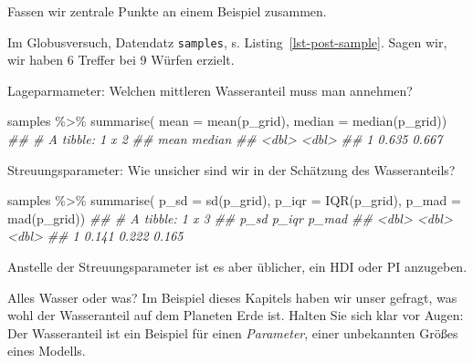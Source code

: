 \documentclass[
  a4paper,
  DIV=11]{scrreprt}
\newenvironment{Shaded}{\begin{snugshade}}{\end{snugshade}}
\newcommand{\AttributeTok}[1]{\textcolor[rgb]{0.40,0.45,0.13}{#1}}
\newcommand{\DocumentationTok}[1]{\textcolor[rgb]{0.37,0.37,0.37}{\textit{#1}}}
\newcommand{\FunctionTok}[1]{\textcolor[rgb]{0.28,0.35,0.67}{#1}}
\newcommand{\NormalTok}[1]{\textcolor[rgb]{0.00,0.23,0.31}{#1}}
\newcommand{\SpecialCharTok}[1]{\textcolor[rgb]{0.37,0.37,0.37}{#1}}
\theoremstyle{definition}
\theoremstyle{remark}
\begin{document}
Fassen wir zentrale Punkte an einem Beispiel zusammen.

Im Globusversuch, Datendatz \texttt{samples}, s.
Listing~\ref{lst-post-sample}. Sagen wir, wir haben 6 Treffer bei 9
Würfen erzielt.

Lageparmameter: Welchen mittleren Wasseranteil muss man annehmen?

\begin{Shaded}
\begin{Highlighting}[]
\NormalTok{samples }\SpecialCharTok{\%\textgreater{}\%} 
  \FunctionTok{summarise}\NormalTok{(}
    \AttributeTok{mean   =} \FunctionTok{mean}\NormalTok{(p\_grid),}
    \AttributeTok{median =} \FunctionTok{median}\NormalTok{(p\_grid))  }
\DocumentationTok{\#\# \# A tibble: 1 x 2}
\DocumentationTok{\#\#    mean median}
\DocumentationTok{\#\#   \textless{}dbl\textgreater{}  \textless{}dbl\textgreater{}}
\DocumentationTok{\#\# 1 0.635  0.667}
\end{Highlighting}
\end{Shaded}

Streuungsparameter: Wie unsicher sind wir in der Schätzung des
Wasseranteils?

\begin{Shaded}
\begin{Highlighting}[]
\NormalTok{samples }\SpecialCharTok{\%\textgreater{}\%} 
  \FunctionTok{summarise}\NormalTok{(}
    \AttributeTok{p\_sd   =} \FunctionTok{sd}\NormalTok{(p\_grid),}
    \AttributeTok{p\_iqr =} \FunctionTok{IQR}\NormalTok{(p\_grid),}
    \AttributeTok{p\_mad =} \FunctionTok{mad}\NormalTok{(p\_grid))  }
\DocumentationTok{\#\# \# A tibble: 1 x 3}
\DocumentationTok{\#\#    p\_sd p\_iqr p\_mad}
\DocumentationTok{\#\#   \textless{}dbl\textgreater{} \textless{}dbl\textgreater{} \textless{}dbl\textgreater{}}
\DocumentationTok{\#\# 1 0.141 0.222 0.165}
\end{Highlighting}
\end{Shaded}

Anstelle der Streuungsparameter ist es aber üblicher, ein HDI oder PI
anzugeben.

\begin{tcolorbox}[enhanced jigsaw, leftrule=.75mm, toptitle=1mm, bottomtitle=1mm, titlerule=0mm, breakable, colframe=quarto-callout-important-color-frame, title=\textcolor{quarto-callout-important-color}{\faExclamation}\hspace{0.5em}{Wichtig}, rightrule=.15mm, colback=white, arc=.35mm, left=2mm, bottomrule=.15mm, coltitle=black, opacitybacktitle=0.6, toprule=.15mm, colbacktitle=quarto-callout-important-color!10!white, opacityback=0]
Alles Wasser oder was? Im Beispiel dieses Kapitels haben wir unser
gefragt, was wohl der Wasseranteil auf dem Planeten Erde ist. Halten Sie
sich klar vor Augen: Der Wasseranteil ist ein Beispiel für einen
\emph{Parameter}, einer unbekannten Größes eines Modells.
\end{tcolorbox}
\end{document}
